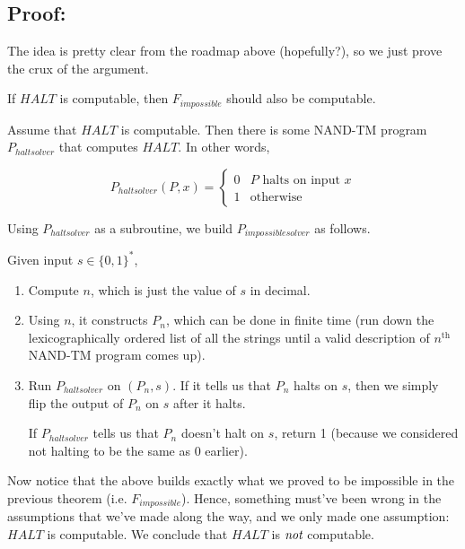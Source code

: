 \documentclass[11pt]{article}
\theoremstyle{definition}
\theoremstyle{remark}
\begin{document}
\subsection{Proof:}

\proof The idea is pretty clear from the roadmap above (hopefully?), so we just prove the crux of the argument.

\begin{center}
     If $HALT$ is computable, then $F_{impossible}$ should also be computable.
 \end{center}
 
Assume that $HALT$ is computable. Then there is some NAND-TM program $P_{haltsolver}$ that computes $HALT$. In other words,

   \begin{equation*}
       P_{haltsolver}(P, x) = \begin{cases}
            0 & \text{$P$ halts on input $x$} \\
            1 & \text{otherwise}
        \end{cases}
    \end{equation*}

    Using $P_{haltsolver}$ as a subroutine, we build $P_{impossiblesolver}$ as follows.

    Given input $s \in \{0, 1\}^*$, 
    \begin{enumerate}
        \item{
                Compute $n$, which is just the value of $s$ in decimal.
            }
        \item{
                Using $n$, it constructs $P_n$, which can be done in finite time (run down the
                lexicographically ordered list of all the strings until a valid description of $n^\text{th}$ NAND-TM
                program comes up).
            }
        \item{
                Run $P_{haltsolver}$ on $(P_n, s)$. If it tells us that $P_n$ halts on $s$, then we simply flip the output
                of $P_n$ on $s$ after it halts.

                If $P_{haltsolver}$ tells us that $P_n$ doesn't halt on $s$, return 1 (because we considered not halting to be
                the same as 0 earlier).
            }
    \end{enumerate}

    Now notice that the above builds exactly what we proved to be impossible in the previous theorem (i.e. $F_{impossible}$). Hence, something must've been wrong in the
    assumptions that we've made along the way, and we only made one assumption: $HALT$ is computable. We conclude that
    $HALT$ is $\emph{not}$ computable.
\end{document}
